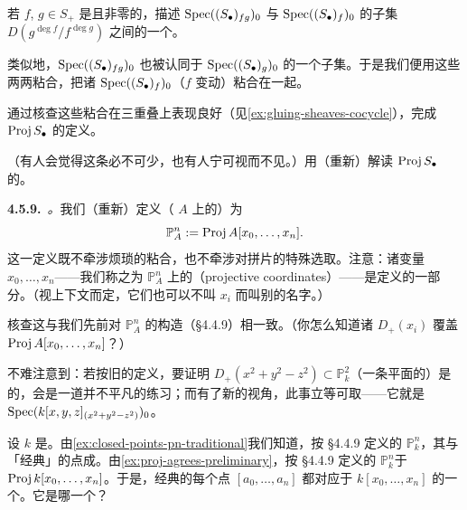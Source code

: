 \begin{exercise}\label{ex:pairwise-gluing-affines}
若 $f$, $g\in S_+$ 是\trHomogeneous{}且非零的，描述 $\operatorname{Spec}((S_\bullet)_{fg})_0$ 与 $\operatorname{Spec}((S_\bullet)_f)_0$ 的\trDistinguishedOpen{}子集 $D(g^{\deg f}/f^{\deg g})$ 之间的一个\trIsomorphism。
\end{exercise}

类似地，$\operatorname{Spec}((S_\bullet)_{fg})_0$ 也被认同于 $\operatorname{Spec}((S_\bullet)_g)_0$ 的一个\trDistinguishedOpen{}子集。于是我们便用这些两两粘合，把诸 $\operatorname{Spec}((S_\bullet)_f)_0$（$f$ 变动）粘合在一起。

\begin{exercise}\label{ex:triple-overlap-proj}
通过核查这些粘合在三重叠上表现良好（见\cref{ex:gluing-sheaves-cocycle}），完成\trScheme{} $\operatorname{Proj} S_\bullet$ 的定义。
\end{exercise}

\begin{exercise}\label{ex:proj-sheaf-compatible-germs}
（有人会觉得这条必不可少，也有人宁可视而不见。）用\trCompatibleGerm{}（重新）解读 $\operatorname{Proj} S_\bullet$ 的\trStructureSheaf。
\end{exercise}

\textbf{4.5.9.}\ \emph{\trhDefinition{}。}\quad 我们（重新）定义\textbf{\trProjectiveSpace}（\trRing{} $A$ 上的）为
\[
\mathbb{P}^n_A:=\operatorname{Proj} A[x_0,\dots,x_n].
\]
这一定义既不牵涉烦琐的粘合，也不牵涉对拼片的特殊选取。注意：诸变量 $x_0,\dots,x_n$——我们称之为 $\mathbb{P}^n_A$ 上的\textbf{\trProjective\trCoordinate}（projective coordinates）——是定义的一部分。（视上下文而定，它们也可以不叫 $x_i$ 而叫别的名字。）

\begin{exercise}\label{ex:proj-agrees-preliminary}
核查这与我们先前对 $\mathbb{P}^n_A$ 的构造（\S4.4.9）相一致。（你怎么知道诸 $D_+(x_i)$ 覆盖 $\operatorname{Proj} A[x_0,\dots,x_n]$？）
\end{exercise}

不难注意到：若按旧的\trProjectiveSpace{}定义，要证明 $D_+(x^2+y^2-z^2)\subset\mathbb{P}^2_k$（一条平面\trConic{}的\trComplement）是\trAffine{}的，会是一道并不平凡的练习；而有了新的视角，此事立等可取——它就是 $\operatorname{Spec}(k[x,y,z]_{(x^2+y^2-z^2)})_0$。

\begin{exercise}\label{ex:classical-point-homogeneous-prime}
设 $k$ 是\trAlgClosedField。由\cref{ex:closed-points-pn-traditional}我们知道，按 \S4.4.9 定义的 $\mathbb{P}^n_k$，其\trClosedPoint{}与「经典」\trProjectiveSpace{}的点成\trBijection。由\cref{ex:proj-agrees-preliminary}，按 \S4.4.9 定义的\trScheme{} $\mathbb{P}^n_k$\trIsomorphic{}于 $\operatorname{Proj} k[x_0,\dots,x_n]$。于是，经典\trProjectiveSpace{}的每个点 $[a_0,\dots,a_n]$ 都对应于 $k[x_0,\dots,x_n]$ 的一个\trHomogeneous\trPrimeIdeal。它是哪一个\trHomogeneous\trPrimeIdeal？
\end{exercise}

